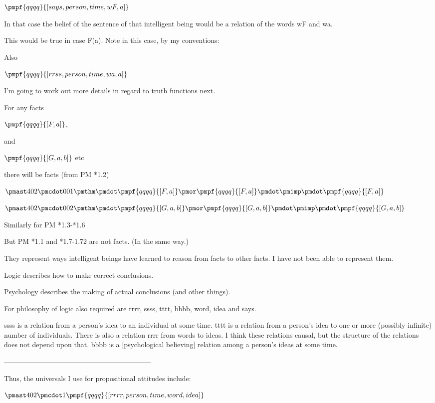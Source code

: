 \documentclass[12pt]{article}
\begin{document}
$\pmpf{qqqq}{[says, person, time, wF, a]}$

In that case the belief of the sentence of that intelligent being would
be a relation of the words wF and wa.

This would be true in case F(a).
Note in this case, by my conventions:

Also

$\pmpf{qqqq}{[rrss, person, time, wa, a]}$

I'm going to work out more details in regard to truth functions next.

For any facts 

$\pmpf{qqqq}{[F,a]}$,

and

$\pmpf{qqqq}{[G, a, b]}$
etc

there will be facts (from PM *1.2)

$\pmast 402 \pmcdot 001 \pmthm \pmdot \pmpf{qqqq}{[F,a]} \pmor \pmpf{qqqq}{[F,a]} \pmdot \pmimp \pmdot \pmpf{qqqq}{[F,a]}$

$\pmast 402 \pmcdot 002 \pmthm \pmdot \pmpf {qqqq}{[G,a,b]} \pmor \pmpf{qqqq}{[G,a,b]} \pmdot \pmimp \pmdot \pmpf{qqqq}{[G,a,b]}$     

Similarly for PM *1.3-*1.6

But PM *1.1 and *1.7-1.72 are not facts. (In the same way.)

They represent ways intelligent beings have learned to
reason from facts to other facts. I have not been able to represent them.

Logic describes how to make correct conclusions.

Psychology describes the making of actual conclusions (and other things).

For philosophy of logic also required are rrrr, ssss, tttt, bbbb, word, idea and says.

ssss is a relation from a person’s idea to an individual at some time. tttt is a relation from a person’s idea to one or more (possibly infinite) number of individuals. There is also a relation rrrr from words to ideas. I think these relations causal, but the structure of the relations does not depend upon that. bbbb is a [psychological believing] relation among a person’s ideas at some time.

---------------------------------------------------------------

Thus, the universals I use for propositional attitudes include:

$\pmast 402 \pmcdot 1 \pmpf{qqqq}{[rrrr, person, time, word, idea]}$
\end{document}
